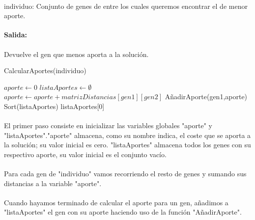 	\paragraph{}individuo: Conjunto de genes de entre los cuales queremos encontrar el de menor aporte.
	
	\paragraph{Salida:}
	
	\paragraph{}Devuelve el gen que menos aporta a la solución.

	\begin{algorithm}[H]
		\caption{CalcularAportes(individuo)}
		\begin{algorithmic}
			\STATE $aporte \leftarrow 0$
			\STATE $listaAportes \leftarrow \emptyset$
			\STATE $aporte \leftarrow aporte + matrizDistancias[gen1][gen2]$
			\ENDFOR
			\STATE AñadirAporte(gen1,aporte)
			\ENDFOR
			\STATE Sort(listaAportes)
			\RETURN listaAportes[0]
		\end{algorithmic}
	\end{algorithm}
	
	\paragraph{}El primer paso consiste en inicializar las variables globales "aporte" y "listaAportes"."aporte" almacena, como su nombre indica, el coste que se aporta a la solución; su valor inicial es cero. "listaAportes" almacena todos los genes con su respectivo aporte, su valor inicial es el conjunto vacío.
	
	\paragraph{}Para cada gen de "individuo" vamos recorriendo el resto de genes y sumando sus distancias a la variable "aporte".
	
	\paragraph{}Cuando hayamos terminado de calcular el aporte para un gen, añadimos a "listaAportes" el gen con su aporte haciendo uso de la función "AñadirAporte".
	
